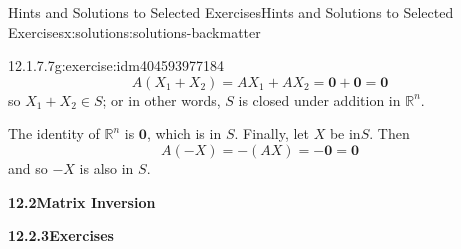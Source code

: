 \documentclass[twoside,10pt,]{book}
\newcommand{\blocktitlefont}{\relax}
\numberwithin{equation}{section}
\begin{document}
\begin{solutions-chapter}{Hints and Solutions to Selected Exercises}{}{Hints and Solutions to Selected Exercises}{}{}{x:solutions:solutions-backmatter}
\begin{divisionsolution}{12.1.7.7}{}{g:exercise:idm404593977184}
\begin{equation*}
A\left(X_1 + X_2 \right) = A X_1 + A X_2 = \pmb{0} + \pmb{0} = \pmb{0}
\end{equation*}
so \(X_1+ X_2 \in  S\); or in other words, \(S\) is closed under addition in \(\mathbb{R}^n\).%
\par
The identity of \(\mathbb{R}^n\) is \(\pmb{0}\), which is in \(S\).  Finally, let \(X\) be in\(S\). Then%
\begin{equation*}
A(-X) = -(A X) = - \pmb{0} = \pmb{0}
\end{equation*}
and so \(-X\) is also in \(S\).%
\end{divisionsolution}%
\par\smallskip
\noindent\textbf{\Large{}12.2\space\textperiodcentered\space{}Matrix Inversion}
\par\smallskip
\par\smallskip
\noindent\textbf{\Large{}12.2.3\space\textperiodcentered\space{}Exercises}
\par\smallskip
{}
\end{solutions-chapter}
\end{document}
